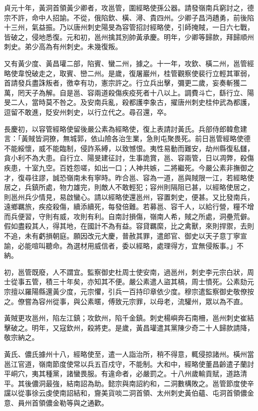 \begin{pinyinscope}
 貞元十年，黃洞首領黃少卿者，攻邕管，圍經略使孫公器。請發嶺南兵窮討之，德宗不許，命中人招諭。不從，俄陷欽、橫、潯、貴四州。少卿子昌沔趫勇，前後陷十三州，氣益振。乃以唐州刺史陽旻為容管招討經略使，引師掩賊，一日六七戰，皆破之，侵地悉復。元和初，邕州擒其別帥黃承慶。明年，少卿等歸款，拜歸順州刺史。弟少高為有州刺史。未幾復叛。



 又有黃少度、黃昌瓘二部，陷賓、蠻二州，據之。十一年，攻欽、橫二州，邕管經略使韋悅破走之，取賓、巒二州。是歲，復屠巖州，桂管觀察使裴行立輕其軍弱，首請發兵盡誅叛者，徼幸有功，憲宗許之。行立兵出擊，彌更二歲，妄奏斬獲二萬，罔天子為解。自是邕、容兩道殺傷疾疫死者十八以上。調費斗亡，繇行立、陽旻二人，當時莫不咎之。及安南兵亂，殺都護李象古，擢唐州刺史桂仲武為都護，逗留不敢進，貶安州刺史，以行立代之。尋召還，卒。



 長慶初，以容管經略使留後嚴公素為經略使，復上表請討黃氏。兵部侍郎韓愈建言：「黃賊皆洞獠，無城郭，依山險各治生業，急則屯聚畏死。前日邕管經略使德不能綏懷，威不能臨制，侵詐系縛，以致憾恨。夷性易動而難安，劫州縣復私讎，貪小利不為大患。自行立、陽旻建征討，生事詭賞，邕、容兩管，日以凋弊，殺傷疾患，十室九空。百姓怨嗟，如出一口；人神共嫉，二將繼死。今嚴公素非撫御之才，復尋往謬，誠恐嶺南未有寧時。昨合邕、容為一道，邕與賊限一江，若經略使居之，兵鎮所處，物力雄完，則敵人不敢輕犯；容州則隔阻已甚，以經略使居之，則邕州兵少情見，易啟蠻心。請以經略使還邕州，容置刺史，便甚。又比發南兵，遠鄉羈旅，疾疫殺傷，續添續死，每發倍難。若募邕、容千人，以給行營，糧不增而兵便習，守則有威，攻則有利。自南討損傷，嶺南人希，賊之所處，洞壘荒僻。假如盡殺其人，得其地，在國計不為有益。容貸羈縻，比之禽獸，來則捍禦，去則不追，未有虧損朝庭。願因改元大慶，普赦其罪，遣郎官、御史以天子意丁寧宣諭，必能喧叫聽命。為選材用威信者，委以經略，處理得方，宜無侵叛事。」不納。



 初，邕管既廢，人不謂宜。監察御史杜周士使安南，過邕州，刺史李元宗白狀，周士從事五管，積三十年矣，亦知其不便。嚴公素遣人盜其槁，周士憤死。公素劾元宗擅以羅陽縣還黃少度，元宗懼，引兵一百持印章依少度。穆宗遣監察御史敬僚按之。僚嘗為容州從事，與公素暱，傅致元宗罪，以母老，流驩州，眾以為不直。



 黃賊更攻邕州，陷左江鎮；攻欽州，陷千金鎮。刺史楊嶼奔石南柵，邕州刺史崔結擊破之。明年，又寇欽州，殺將吏。是歲，黃昌瓘遣其黨陳少奇二十人歸款請降，敬宗納之。



 黃氏、儂氏據州十八，經略使至，遣一人詣治所，稍不得意，輒侵掠諸州。橫州當邕江官道，嶺南節度使常以兵五百戍守，不能制。大和中，經略使董昌齡遣子蘭討平峒穴，夷其種黨，諸蠻畏服。有違命者，必嚴罰之。十八州歲輸貢賦，道路清平。其後儂洞最強，結南詔為助。懿宗與南詔約和，二洞數構敗之。邕管節度使辛讜以從事徐云虔使南詔結和，齎美貨啖二洞首領、太州刺史黃伯蘊、屯洞首領儂金意、員州首領儂金勒等與之通歡。




\end{pinyinscope}
